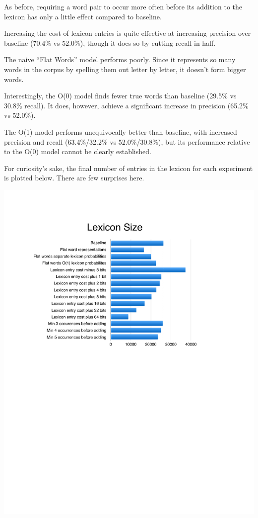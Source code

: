 \documentclass[11pt, oneside, fleqn]{article}
\begin{document}
	As before, requiring a word pair to occur more often before its addition to the lexicon has only a little effect compared to baseline.

	Increasing the cost of lexicon entries is quite effective at increasing precision over baseline (70.4\% vs 52.0\%), though it does so by cutting recall in half.

	The naive ``Flat Words'' model performs poorly. Since it represents so many words in the corpus by spelling them out letter by letter, it doesn't form bigger words.

	Interestingly, the O(0) model finds fewer true words than baseline (29.5\% vs 30.8\% recall). It does, however, achieve a significant increase in precision (65.2\% vs 52.0\%).

	The O(1) model performs unequivocally better than baseline, with increased precision and recall (63.4\%/32.2\% vs 52.0\%/30.8\%), but its performance relative to the O(0) model cannot be clearly established.

	\pagebreak

	For curiosity's sake, the final number of entries in the lexicon for each experiment is plotted below. There are few surprises here.

  \includegraphics{./figure/lexicon_size.pdf}
\end{document}
